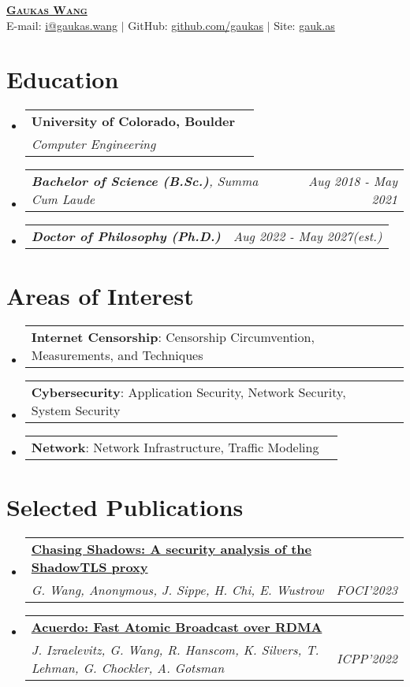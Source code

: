 \documentclass[letterpaper,11pt]{article}
\makeatletter
\newcommand{\resumeSubheading}[4]{
  \vspace{-2pt}\item
    \begin{tabular*}{0.97\textwidth}[t]{l@{\extracolsep{\fill}}r}
      \textbf{#1} & #2 \\
      \textit{\small#3} & \textit{\small #4} \\
    \end{tabular*}\vspace{-7pt}
}
\newcommand{\resumeSubSubheading}[2]{
    \item
    \begin{tabular*}{0.97\textwidth}{l@{\extracolsep{\fill}}r}
      \textit{\small#1} & \textit{\small #2} \\
    \end{tabular*}\vspace{-7pt}
}
\newcommand{\resumeProjectHeading}[2]{
    \item
    \begin{tabular*}{0.97\textwidth}{l@{\extracolsep{\fill}}r}
      \small#1 & #2 \\
    \end{tabular*}\vspace{-7pt}
}
\newcommand{\resumeSubHeadingListStart}{\begin{itemize}[leftmargin=0.15in, label={}]}
\newcommand{\resumeSubHeadingListEnd}{\end{itemize}}
\makeatother
\begin{document}
\begin{center}
  \href{https://gaukas.wang}{\textbf{\Huge \scshape Gaukas Wang}} \\ \vspace{1pt}
    E-mail: \href{mailto:i@gaukas.wang}{{i@gaukas.wang}} $|$ 
    GitHub: \href{https://github.com/gaukas}{{github.com/gaukas}} $|$ 
    Site: \href{https://gauk.as}{gauk.as}
\end{center}


\section{Education}
\resumeSubHeadingListStart
\resumeSubheading
{University of Colorado, Boulder}{}
{Computer Engineering}{}
\resumeSubSubheading
{\textbf{Bachelor of Science (B.Sc.)}, {Summa Cum Laude}}{Aug 2018 - May 2021}
\resumeSubSubheading
{\textbf{Doctor of Philosophy (Ph.D.)}}{Aug 2022 - May 2027\textit{(est.)}}
\resumeSubHeadingListEnd

\vspace{1pt}

\section{Areas of Interest}
\resumeSubHeadingListStart

\resumeProjectHeading
{\textbf{Internet Censorship}: Censorship Circumvention, Measurements, and Techniques}{}

\resumeProjectHeading
{\textbf{Cybersecurity}: Application Security, Network Security, System Security}{}

\resumeProjectHeading
{\textbf{Network}: Network Infrastructure, Traffic Modeling}{}

\resumeSubHeadingListEnd
\vspace{1pt}

\section{Selected Publications}
\resumeSubHeadingListStart
  \resumeSubheading
  {\href{https://gaukas.wang/paper/foci23-wang.pdf}{\textbf{Chasing Shadows: A security analysis of the ShadowTLS proxy}}}{}
  {\emph{G. Wang, Anonymous, J. Sippe, H. Chi, E. Wustrow} }{FOCI'2023}
  \resumeSubheading
  {\href{https://gaukas.wang/paper/icpp22-izraelevitz.pdf}{\textbf{Acuerdo: Fast Atomic Broadcast over RDMA}}}{}
  {\emph{J. Izraelevitz, G. Wang, R. Hanscom, K. Silvers, T. Lehman, G. Chockler, A. Gotsman} }{ICPP'2022}
\resumeSubHeadingListEnd
\vspace{1pt}
\end{document}
